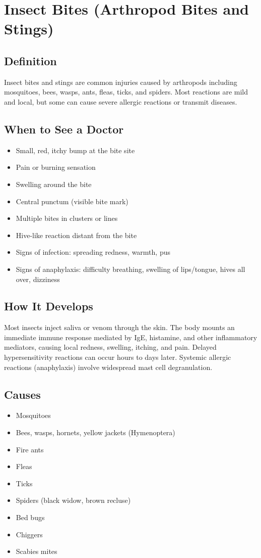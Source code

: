 \chapter{Insect Bites (Arthropod Bites and Stings)}

\section*{Definition}
Insect bites and stings are common injuries caused by arthropods including mosquitoes, bees, wasps, ants, fleas, ticks, and spiders. Most reactions are mild and local, but some can cause severe allergic reactions or transmit diseases.

\section*{When to See a Doctor}
\begin{itemize}
\item Small, red, itchy bump at the bite site
\item Pain or burning sensation
\item Swelling around the bite
\item Central punctum (visible bite mark)
\item Multiple bites in clusters or lines
\item Hive-like reaction distant from the bite
\item Signs of infection: spreading redness, warmth, pus
\item Signs of anaphylaxis: difficulty breathing, swelling of lips/tongue, hives all over, dizziness
\end{itemize}

\section*{How It Develops}
Most insects inject saliva or venom through the skin. The body mounts an immediate immune response mediated by IgE, histamine, and other inflammatory mediators, causing local redness, swelling, itching, and pain. Delayed hypersensitivity reactions can occur hours to days later. Systemic allergic reactions (anaphylaxis) involve widespread mast cell degranulation.

\section*{Causes}
\begin{itemize}
\item Mosquitoes
\item Bees, wasps, hornets, yellow jackets (Hymenoptera)
\item Fire ants
\item Fleas
\item Ticks
\item Spiders (black widow, brown recluse)
\item Bed bugs
\item Chiggers
\item Scabies mites
\end{itemize}

